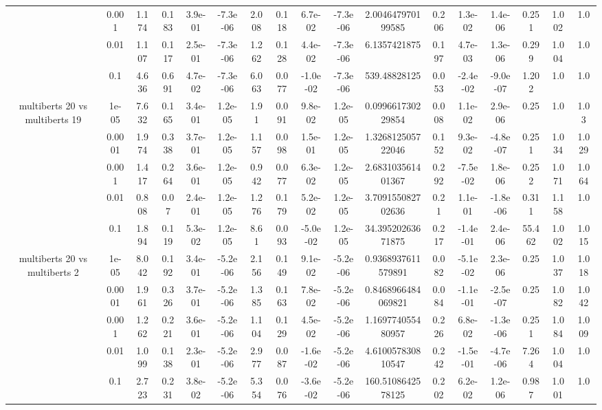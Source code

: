 \begin{tabular}{|c|c|c|c|c|c|c|c|c|c|c|c|c|c|c|c|c|}
 & 0.001 & 1.174 & 0.183 & 3.9e-01 & -7.3e-06 & 2.008 & 0.118 & 6.7e-02 & -7.3e-06 & 2.004647970199585 & 0.206 & 1.3e-02 & 1.4e-06 & 0.251 & 1.002 & 1.0 \\
 & 0.01 & 1.107 & 0.117 & 2.5e-01 & -7.3e-06 & 1.262 & 0.128 & 4.4e-02 & -7.3e-06 & 6.1357421875 & 0.197 & 4.7e-03 & 1.3e-06 & 0.299 & 1.004 & 1.0 \\
 & 0.1 & 4.636 & 0.691 & 4.7e-02 & -7.3e-06 & 6.063 & 0.077 & -1.0e-02 & -7.3e-06 & 539.48828125 & 0.053 & -2.4e-02 & -9.0e-07 & 1.202 & 1.0 & 1.0 \\
\hline
\multirow{5}{*}{multiberts 20 vs multiberts 19} & 1e-05 & 7.632 & 0.165 & 3.4e-01 & 1.2e-05 & 1.91 & 0.091 & 9.8e-02 & 1.2e-05 & 0.099661730229854 & 0.008 & 1.1e-02 & 2.9e-06 & 0.25 & 1.0 & 1.03 \\
 & 0.0001 & 1.974 & 0.338 & 3.7e-01 & 1.2e-05 & 1.157 & 0.098 & 1.5e-01 & 1.2e-05 & 1.326812505722046 & 0.152 & 9.3e-02 & -4.8e-07 & 0.251 & 1.034 & 1.029 \\
 & 0.001 & 1.417 & 0.264 & 3.6e-01 & 1.2e-05 & 0.942 & 0.077 & 6.3e-02 & 1.2e-05 & 2.683103561401367 & 0.292 & -7.5e-02 & 1.8e-06 & 0.252 & 1.071 & 1.064 \\
 & 0.01 & 0.808 & 0.07 & 2.4e-01 & 1.2e-05 & 1.276 & 0.179 & 5.2e-02 & 1.2e-05 & 3.709155082702636 & 0.21 & 1.1e-01 & -1.8e-06 & 0.311 & 1.158 & 1.0 \\
 & 0.1 & 1.894 & 0.119 & 5.3e-02 & 1.2e-05 & 8.61 & 0.093 & -5.0e-02 & 1.2e-05 & 34.39520263671875 & 0.217 & -1.4e-01 & 2.4e-06 & 55.462 & 1.002 & 1.015 \\
\hline
\multirow{5}{*}{multiberts 20 vs multiberts 2} & 1e-05 & 8.042 & 0.192 & 3.4e-01 & -5.2e-06 & 2.156 & 0.149 & 9.1e-02 & -5.2e-06 & 0.9368937611579891 & 0.082 & -5.1e-02 & 2.3e-06 & 0.25 & 1.037 & 1.018 \\
 & 0.0001 & 1.961 & 0.326 & 3.7e-01 & -5.2e-06 & 1.385 & 0.163 & 7.8e-02 & -5.2e-06 & 0.8468966484069821 & 0.084 & -1.1e-01 & -2.5e-07 & 0.25 & 1.082 & 1.042 \\
 & 0.001 & 1.262 & 0.221 & 3.6e-01 & -5.2e-06 & 1.104 & 0.129 & 4.5e-02 & -5.2e-06 & 1.169774055480957 & 0.226 & 6.8e-02 & -1.3e-06 & 0.251 & 1.084 & 1.009 \\
 & 0.01 & 1.099 & 0.138 & 2.3e-01 & -5.2e-06 & 2.977 & 0.087 & -1.6e-02 & -5.2e-06 & 4.610057830810547 & 0.242 & -1.5e-01 & -4.7e-06 & 7.264 & 1.004 & 1.0 \\
 & 0.1 & 2.723 & 0.231 & 3.8e-02 & -5.2e-06 & 5.354 & 0.076 & -3.6e-02 & -5.2e-06 & 160.5108642578125 & 0.202 & 6.2e-02 & 1.2e-06 & 0.987 & 1.001 & 1.0 \\

\end{tabular}
